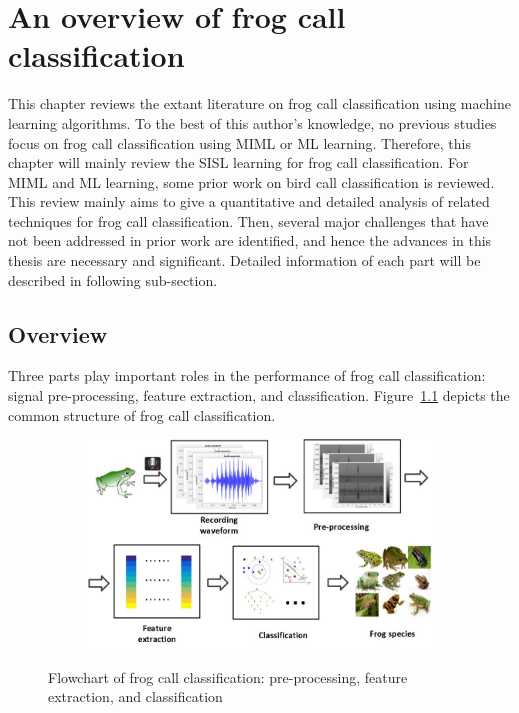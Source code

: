 
\chapter[Literature review]{An overview of frog call classification}
\label{cha:cha2LiteratureReview}

This chapter reviews the extant literature on frog call classification using machine learning algorithms. To the best of this author's knowledge, no previous studies focus on frog call classification using MIML or ML learning. Therefore, this chapter will mainly review the SISL learning for frog call classification. For MIML and ML learning, some prior work on bird call classification is reviewed. This review mainly aims to give a quantitative and detailed analysis of related techniques for frog call classification. 
Then, several major challenges that have not been addressed in prior work are identified, and hence the advances in this thesis are necessary and significant. Detailed information of each part will be described in following sub-section.

\section{Overview}
Three parts play important roles in the performance of frog call classification: signal pre-processing, feature extraction, and classification. Figure~\ref{ch2:fig:flowchart} depicts the common structure of frog call classification.

\begin{figure}[htb!]
\centering
    \begin{subfigure}[b]{\textwidth}
           \includegraphics[width=\textwidth]{image/Ch1/flowchart.jpg}
    \end{subfigure}%
\caption[Flowchart of frog call classification]{Flowchart of frog call classification: pre-processing, feature extraction, and classification}
\label{ch2:fig:flowchart}       
\end{figure}


